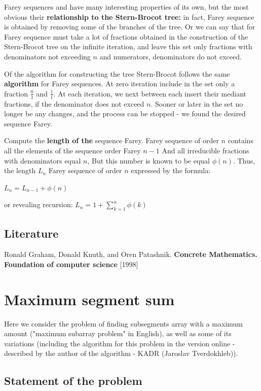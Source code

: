 Farey sequences and have many interesting properties of its own, but the most obvious their \textbf{relationship to the Stern-Brocot tree:} in fact, Farey sequence is obtained by removing some of the branches of the tree. Or we can say that for Farey sequence must take a lot of fractions obtained in the construction of the Stern-Brocot tree on the infinite iteration, and leave this set only fractions with denominators not exceeding $n$ and numerators, denominators do not exceed.

Of the algorithm for constructing the tree Stern-Brocot follows the same \textbf{algorithm} for Farey sequences. At zero iteration include in the set only a fraction $\frac {0} {1}$ and $\frac {1} {1}$. At each iteration, we next between each insert their mediant fractions, if the denominator does not exceed $n$. Sooner or later in the set no longer be any changes, and the process can be stopped - we found the desired sequence Farey.

Compute the \textbf{length of the} sequence Farey. Farey sequence of order $n$ contains all the elements of the sequence order Farey $n-1$ And all irreducible fractions with denominators equal $n$, But this number is known to be equal $\phi (n)$. Thus, the length $L_n$ Farey sequence of order $n$ expressed by the formula:

$L_n = L_ {n-1} + \phi (n)$

or revealing recursion:
$L_n = 1 + \sum_ {k = 1} ^ n \phi (k)$

\subsection{ Literature }

Ronald Graham, Donald Knuth, and Oren Patashnik. \textbf{Concrete Mathematics.} \textbf{Foundation of computer science} [1998]

\section{ Maximum segment sum }
Here we consider the problem of finding subsegments array with a maximum amount ("maximum subarray problem" in English), as well as some of its variations (including the algorithm for this problem in the version online - described by the author of the algorithm - KADR (Jaroslav Tverdokhleb)).

\subsection{ Statement of the problem }

